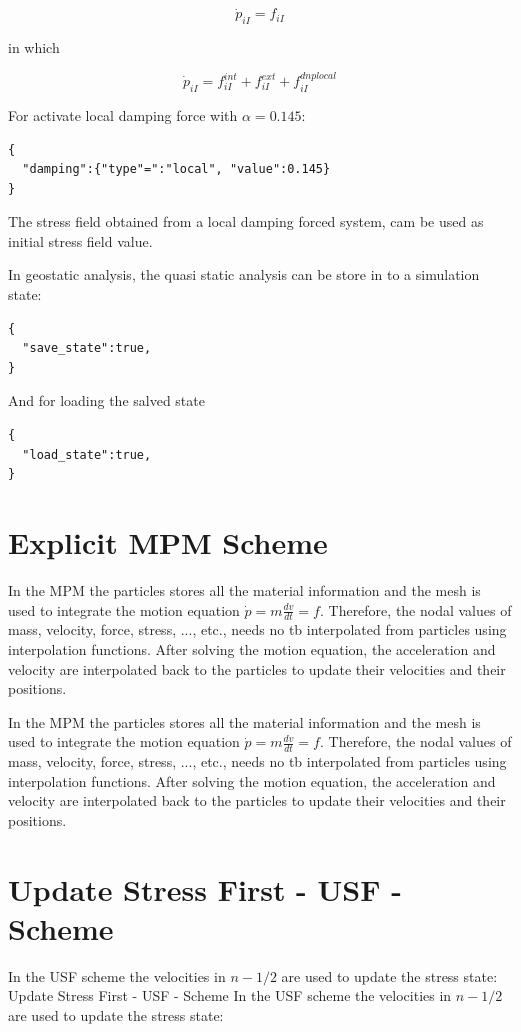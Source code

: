 \documentclass[11pt,a4paper]{article}
\begin{document}
$$ \dot{p}_{iI} = f_{iI} $$

in which
 
$$ \dot{p}_{iI} = f_{iI}^{int} + f_{iI}^{ext} + f_{iI}^{dnplocal} $$

For activate local damping force with  $ \alpha = 0.145  $:

\begin{lstlisting}[language={},caption={input JSON}]
{
  "damping":{"type"=":"local", "value":0.145}
}
\end{lstlisting}

The stress field obtained from a local damping forced system, cam be used as initial stress field value.

In geostatic analysis, the quasi static analysis can be store in to a simulation state:

\begin{lstlisting}[language={},caption={input JSON}]
{
  "save_state":true,
}
\end{lstlisting}

And for loading the salved state

\begin{lstlisting}[language={},caption={input JSON}]
{
  "load_state":true,
}
\end{lstlisting}

\section{Explicit MPM Scheme}

In the MPM the particles stores all the material information and the mesh is used to integrate the motion equation $ \dot{p} = m \frac{dv}{dt} = f $. Therefore, the nodal values of mass, velocity, force, stress, ..., etc., needs no tb interpolated from particles using interpolation functions. After solving the motion equation, the acceleration and velocity are interpolated back to the particles to update their velocities and their positions.

In the MPM the particles stores all the material information and the mesh is used to integrate the motion equation $ \dot{p} = m \frac{dv}{dt} = f $. Therefore, the nodal values of mass, velocity, force, stress, ..., etc., needs no tb interpolated from particles using interpolation functions. After solving the motion equation, the acceleration and velocity are interpolated back to the particles to update their velocities and their positions.

\section{Update Stress First - USF - Scheme}
In the USF scheme the velocities in  $ n-1/2  $ are used to update the stress state:
Update Stress First - USF - Scheme
In the USF scheme the velocities in  $ n-1/2  $ are used to update the stress state:
\end{document}
